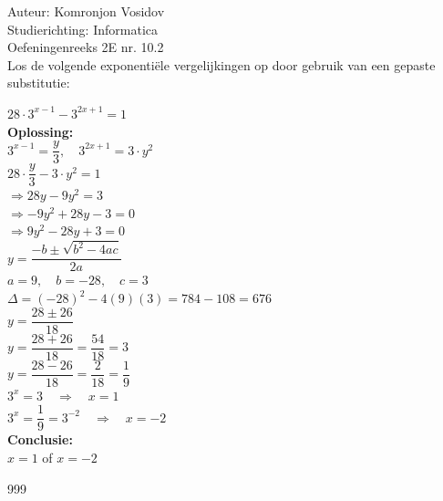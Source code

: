 \documentclass[a4paper]{article}
\begin{document}
	
	\noindent \large Auteur: Komronjon Vosidov \\
	\noindent \large Studierichting: Informatica\\
	\noindent \large Oefeningenreeks 2E nr. 10.2\\
	
	
	
	\normalsize
	Los de volgende exponentiële vergelijkingen op door gebruik van een gepaste substitutie: 
	
$ 28 \cdot 3^{x-1} - 3^{2x+1} = 1 $ \\

\textbf{Oplossing:} \\

$ 3^{x-1} = \dfrac{y}{3}, \quad 3^{2x+1} = 3 \cdot y^2 $ \\

$ 28 \cdot \dfrac{y}{3} - 3 \cdot y^2 = 1 $ \\

$ \Rightarrow 28y - 9y^2 = 3 $ \\

$ \Rightarrow -9y^2 + 28y - 3 = 0 $ \\

$ \Rightarrow 9y^2 - 28y + 3 = 0 $ \\

$ y = \dfrac{-b \pm \sqrt{b^2 - 4ac}}{2a} $ \\

$ a = 9, \quad b = -28, \quad c = 3 $ \\

$ \Delta = (-28)^2 - 4(9)(3) = 784 - 108 = 676 $ \\

$ y = \dfrac{28 \pm 26}{18} $ \\

$ y = \dfrac{28 + 26}{18} = \dfrac{54}{18} = 3 $ \\

$ y = \dfrac{28 - 26}{18} = \dfrac{2}{18} = \dfrac{1}{9} $ \\

$ 3^x = 3 \quad \Rightarrow \quad x = 1 $ \\

$ 3^x = \dfrac{1}{9} = 3^{-2} \quad \Rightarrow \quad x = -2 $ \\

\textbf{Conclusie:} \\

$ x = 1 $ of $ x = -2 $

	
	
	\begin{thebibliography}{999}
	\end{thebibliography}	
\end{document}
